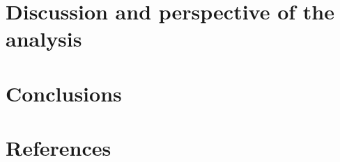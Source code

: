 \documentclass[
]{article}
\begin{document}
\hypertarget{discussion-and-perspective-of-the-analysis}{%
\section{Discussion and perspective of the analysis}\label{discussion-and-perspective-of-the-analysis}}

\hypertarget{conclusions}{%
\section{Conclusions}\label{conclusions}}

\newpage

\hypertarget{references}{%
\section*{References}\label{references}}
\end{document}
